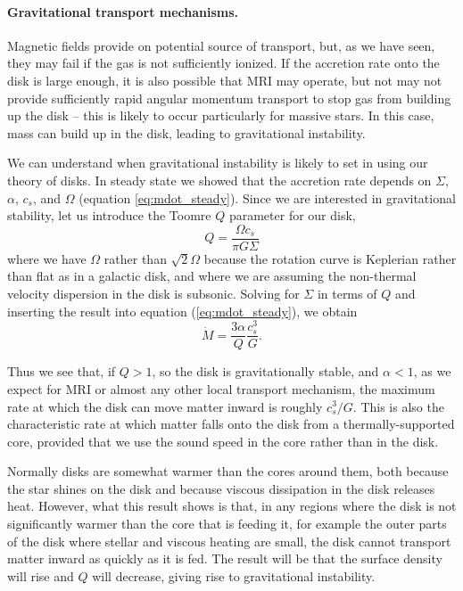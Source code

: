 \paragraph{Gravitational transport mechanisms.}

Magnetic fields provide on potential source of transport, but, as we have seen, they may fail if the gas is not sufficiently ionized. If the accretion rate onto the disk is large enough, it is also possible that MRI may operate, but not may not provide sufficiently rapid angular momentum transport to stop gas from building up the disk -- this is likely to occur particularly for massive stars. In this case, mass can build up in the disk, leading to gravitational instability.

We can understand when gravitational instability is likely to set in using our theory of disks. In steady state we showed that the accretion rate depends on $\Sigma$, $\alpha$, $c_s$, and $\Omega$ (equation \ref{eq:mdot_steady}). Since we are interested in gravitational stability, let us introduce the Toomre $Q$ parameter for our disk,
\begin{equation}
Q = \frac{\Omega c_s}{\pi G \Sigma}
\end{equation}
where we have $\Omega$ rather than $\sqrt{2}\Omega$ because the rotation curve is Keplerian rather than flat as in a galactic disk, and where we are assuming the non-thermal velocity dispersion in the disk is subsonic. Solving for $\Sigma$ in terms of $Q$ and inserting the result into equation (\ref{eq:mdot_steady}), we obtain
\begin{equation}
\dot{M} = \frac{3\alpha}{Q} \frac{c_s^3}{G}.
\end{equation}

Thus we see that, if $Q > 1$, so the disk is gravitationally stable, and $\alpha < 1$, as we expect for MRI or almost any other local transport mechanism, the maximum rate at which the disk can move matter inward is roughly $c_s^3/G$. This is also the characteristic rate at which matter falls onto the disk from a thermally-supported core, provided that we use the sound speed in the core rather than in the disk.

Normally disks are somewhat warmer than the cores around them, both because the star shines on the disk and because viscous dissipation in the disk releases heat. However, what this result shows is that, in any regions where the disk is not significantly warmer than the core that is feeding it, for example the outer parts of the disk where stellar and viscous heating are small, the disk cannot transport matter inward as quickly as it is fed. The result will be that the surface density will rise and $Q$ will decrease, giving rise to gravitational instability.

